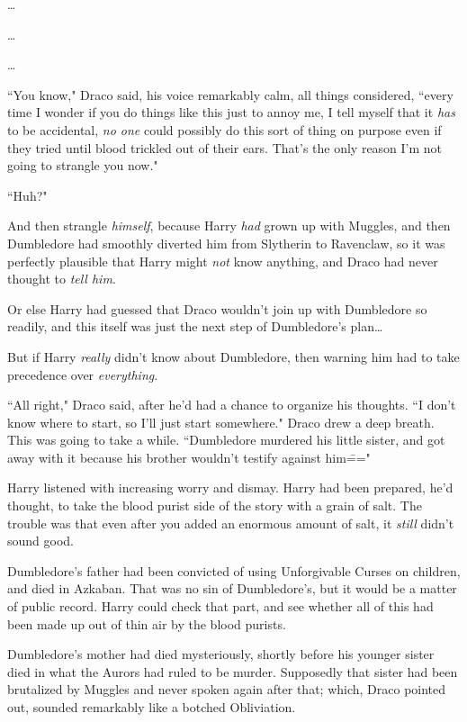 {\ldots}

{\ldots}

{\ldots}

``You know," Draco said, his voice remarkably calm, all things considered, ``every time I wonder if you do things like this just to annoy me, I tell myself that it \emph{has} to be accidental, \emph{no one} could possibly do this sort of thing on purpose even if they tried until blood trickled out of their ears. That's the only reason I'm not going to strangle you now."

``Huh?"

And then strangle \emph{himself}, because Harry \emph{had} grown up with Muggles, and then Dumbledore had smoothly diverted him from Slytherin to Ravenclaw, so it was perfectly plausible that Harry might \emph{not} know anything, and Draco had never thought to \emph{tell him}.

Or else Harry had guessed that Draco wouldn't join up with Dumbledore so readily, and this itself was just the next step of Dumbledore's plan{\ldots}

But if Harry \emph{really} didn't know about Dumbledore, then warning him had to take precedence over \emph{everything}.

``All right," Draco said, after he'd had a chance to organize his thoughts. ``I don't know where to start, so I'll just start somewhere." Draco drew a deep breath. This was going to take a while. ``Dumbledore murdered his little sister, and got away with it because his brother wouldn't testify against him\==="

\later

Harry listened with increasing worry and dismay. Harry had been prepared, he'd thought, to take the blood purist side of the story with a grain of salt. The trouble was that even after you added an enormous amount of salt, it \emph{still} didn't sound good.

Dumbledore's father had been convicted of using Unforgivable Curses on children, and died in Azkaban. That was no sin of Dumbledore's, but it would be a matter of public record. Harry could check that part, and see whether all of this had been made up out of thin air by the blood purists.

Dumbledore's mother had died mysteriously, shortly before his younger sister died in what the Aurors had ruled to be murder. Supposedly that sister had been brutalized by Muggles and never spoken again after that; which, Draco pointed out, sounded remarkably like a botched Obliviation.

